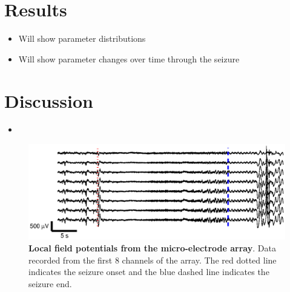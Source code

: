 \documentclass[]{article}
\begin{document}
\section{Results}
\begin{itemize}
	\item Will show parameter distributions
	\item Will show parameter changes over time through the seizure
\end{itemize}

\section{Discussion}

\begin{itemize}
	\item  
\end{itemize}

\begin{figure}[!ht]
\begin{center}
\includegraphics{./Figures/LFPs.eps}
\end{center}
\caption{{\bf Local field potentials from the micro-electrode array}. Data recorded from the first 8 channels of the array. The red dotted line indicates the seizure onset and the blue dashed line indicates the seizure end.}
\label{fig:TimeSeries}
\end{figure}
\end{document}
